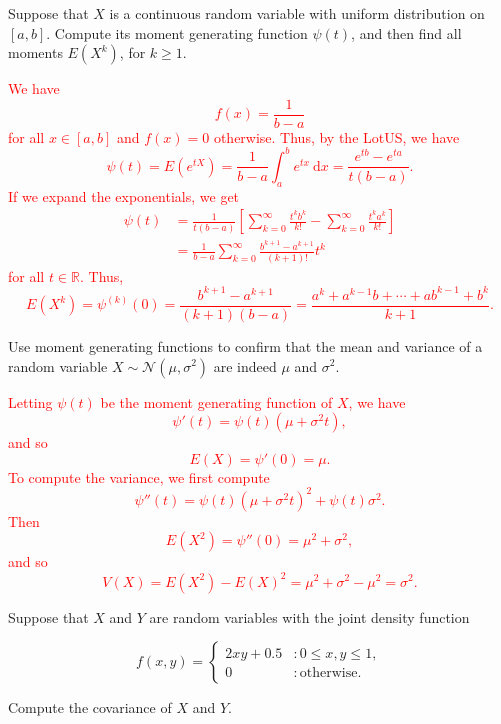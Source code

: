 \documentclass[12pt,reqno]{amsart}
\begin{document}
\prob Suppose that $X$ is a continuous random variable with uniform distribution on $[a,b]$. Compute its moment generating function $\psi(t)$, and then find all moments $E(X^k)$, for $k\geq 1$.

\bigskip
\textcolor{red}{We have
	\[f(x) = \frac{1}{b-a}
	\]
for all $x\in [a,b]$ and $f(x) = 0$ otherwise. Thus, by the LotUS, we have
	\[\psi(t) = E(e^{tX}) = \frac{1}{b-a} \int_a^b e^{tx} \ \text{d}x = \frac{e^{tb} - e^{ta}}{t(b-a)}.
	\]
If we expand the exponentials, we get
	\begin{align*}
	\psi(t) &= \frac{1}{t(b-a)} \left[ \sum_{k=0}^\infty \frac{t^kb^k}{k!} - \sum_{k=0}^\infty \frac{t^ka^k}{k!} \right] \\
	&= \frac{1}{b-a} \sum_{k=0}^\infty \frac{b^{k+1} - a^{k+1}}{(k+1)!} t^k
	\end{align*}
for all $t\in \mathbb{R}$. Thus,
	\[E(X^k) = \psi^{(k)}(0) = \frac{b^{k+1} - a^{k+1}}{(k+1)(b-a)} = \frac{a^k + a^{k-1}b + \cdots + ab^{k-1} + b^k}{k+1}.
	\]}
\bigskip











\prob Use moment generating functions to confirm that the mean and variance of a random variable $X \sim \mathcal{N}(\mu,\sigma^2)$ are indeed $\mu$ and $\sigma^2$.

\bigskip
\textcolor{red}{Letting $\psi(t)$ be the moment generating function of $X$, we have
	\[\psi'(t) = \psi(t) (\mu + \sigma^2 t),
	\]
and so
	\[E(X) = \psi'(0) =  \mu.
	\]
To compute the variance, we first compute
	\[\psi''(t) = \psi(t) (\mu + \sigma^2 t)^2 + \psi(t) \sigma^2.
	\]
Then
	\[E(X^2) = \psi''(0) = \mu^2 + \sigma^2,
	\]
and so
	\[V(X) = E(X^2) - E(X)^2 = \mu^2 + \sigma^2 - \mu^2 = \sigma^2.
	\]}
\bigskip












\prob Suppose that $X$ and $Y$ are random variables with the joint density function

	\[
	f(x,y) = \begin{cases}
	2xy + 0.5 & : 0 \leq x, y \leq 1, \\
	0 & : \text{otherwise}.
	\end{cases}
	\]
	
Compute the covariance of $X$ and $Y$.
\end{document}
